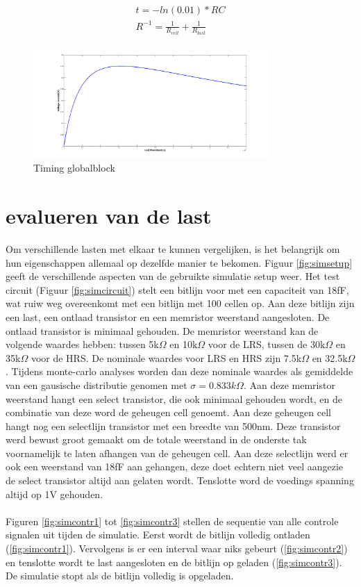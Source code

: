 \begin{align}
t = -ln(0.01)*RC\\
R^{-1} = \frac{1}{R_{cell}} + \frac{1}{R_{last}}
\end{align}


\begin{figure}[!ht]
  \centering
  \includegraphics[width=0.8\textwidth]{../fig/hfdst-last-rpiek.png}
  \caption{Timing globalblock}
  \label{fig:rpiek}
\end{figure}



\section{evalueren van de last}
Om verschillende lasten met elkaar te kunnen vergelijken, is het belangrijk om hun eigenschappen allemaal op dezelfde manier te bekomen. Figuur \ref{fig:simsetup} geeft de verschillende aspecten van de gebruikte simulatie setup weer. Het test circuit (Figuur \ref{fig:simcircuit}) stelt een bitlijn voor met een capaciteit van 18fF, wat ruiw weg overeenkomt met een bitlijn met 100 cellen op. Aan deze bitlijn zijn een last, een ontlaad transistor en een memristor weerstand aangesloten. De ontlaad transistor is minimaal gehouden. De memristor weerstand kan de volgende waardes hebben: tussen 5k$\Omega$ en 10k$\Omega$ voor de LRS, tussen de 30k$\Omega$ en 35k$\Omega$ voor de HRS. De nominale waardes voor LRS en HRS zijn 7.5k$\Omega$ en 32.5k$\Omega$. Tijdens monte-carlo analyses worden dan deze nominale waardes als gemiddelde van een gausische distributie genomen met $\sigma = 0.833k\Omega$. Aan deze memristor weerstand hangt een select transistor, die ook minimaal gehouden wordt, en de combinatie van deze word de geheugen cell genoemt. Aan deze geheugen cell hangt nog een selectlijn transistor met een breedte van 500nm. Deze transistor werd bewust groot gemaakt om de totale weerstand in de onderste tak voornamelijk te laten afhangen van de geheugen cell. Aan deze selectlijn werd er ook een weerstand van 18fF aan gehangen, deze doet echtern niet veel aangezie de select transistor altijd aan gelaten wordt. Tenslotte word de voedings spanning altijd op 1V gehouden.\\\\
Figuren \ref{fig:simcontr1} tot \ref{fig:simcontr3} stellen de sequentie van alle controle signalen uit tijden de simulatie. Eerst wordt de bitlijn volledig ontladen (\ref{fig:simcontr1}). Vervolgens is er een interval waar niks gebeurt (\ref{fig:simcontr2}) en tenslotte wordt te last aangesloten en de bitlijn op geladen (\ref{fig:simcontr3}). De simulatie stopt als de bitlijn volledig is opgeladen.\\

